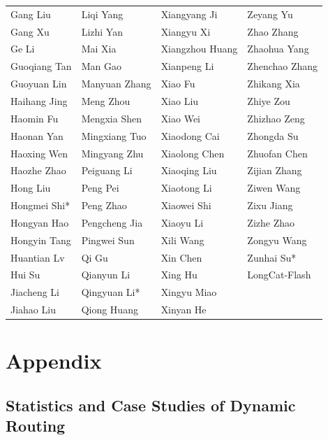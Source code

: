 \documentclass{article}
\begin{document}
\begin{tabular}{p{}p{}p{}p{}}
Gang Liu & Liqi Yang & Xiangyang Ji & Zeyang Yu \\
Gang Xu & Lizhi Yan & Xiangyu Xi & Zhao Zhang \\
Ge Li & Mai Xia & Xiangzhou Huang & Zhaohua Yang \\
Guoqiang Tan & Man Gao & Xianpeng Li & Zhenchao Zhang \\
Guoyuan Lin & Manyuan Zhang & Xiao Fu & Zhikang Xia \\
Haihang Jing & Meng Zhou & Xiao Liu & Zhiye Zou \\
Haomin Fu & Mengxia Shen & Xiao Wei & Zhizhao Zeng \\
Haonan Yan & Mingxiang Tuo & Xiaodong Cai & Zhongda Su \\
Haoxing Wen & Mingyang Zhu & Xiaolong Chen & Zhuofan Chen \\
Haozhe Zhao & Peiguang Li & Xiaoqing Liu & Zijian Zhang \\
Hong Liu & Peng Pei & Xiaotong Li & Ziwen Wang \\
Hongmei Shi* & Peng Zhao & Xiaowei Shi & Zixu Jiang \\
Hongyan Hao & Pengcheng Jia & Xiaoyu Li & Zizhe Zhao \\
Hongyin Tang & Pingwei Sun & Xili Wang & Zongyu Wang \\
Huantian Lv & Qi Gu & Xin Chen & Zunhai Su* \\
Hui Su & Qianyun Li & Xing Hu &  LongCat-Flash\\
Jiacheng Li & Qingyuan Li* & Xingyu Miao &  \\
Jiahao Liu & Qiong Huang & Xinyan He &  \\
\end{tabular}


  

\clearpage

\appendix
\section{Appendix}\label{appendix}

\subsection{Statistics and Case Studies of Dynamic Routing}\label{appendix:pretrain_dynamics}
\end{document}
